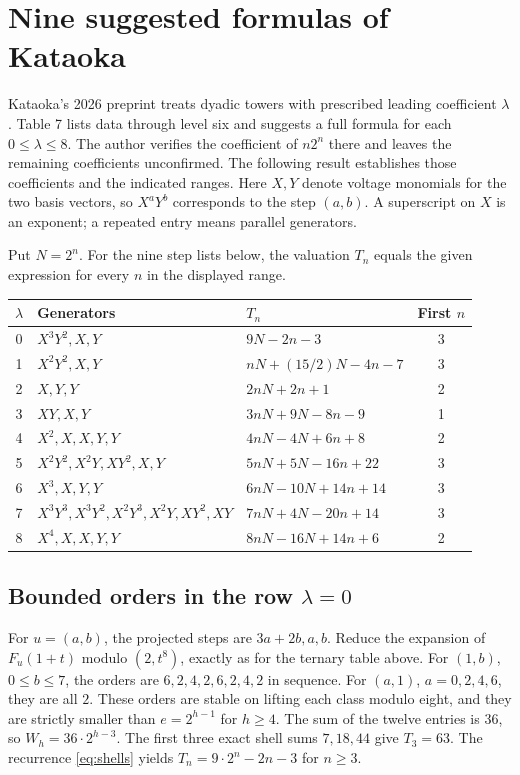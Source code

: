 \section{Nine suggested formulas of Kataoka}\label{sec:kataoka}
Kataoka's 2026 preprint \cite[\S6.3, Tables 6--7]{Kat} treats dyadic
towers with prescribed leading coefficient $\lambda$. Table 7 lists data
through level six and suggests a full formula for each $0\le\lambda\le8$.
The author verifies the coefficient of $n2^n$ there and leaves the
remaining coefficients unconfirmed. The following result establishes those
coefficients and the indicated ranges. Here $X,Y$ denote voltage
monomials for the two basis vectors, so $X^aY^b$ corresponds to the step
$(a,b)$. A superscript on $X$ is an exponent; a repeated entry means
parallel generators.

\begin{theorem}\label{thm:kataoka}
Put $N=2^n$. For the nine step lists below, the valuation $T_n$ equals the
given expression for every $n$ in the displayed range.
\begin{center}\small
\begin{tabular}{cllc}
\toprule
$\lambda$ & Generators & $T_n$ & First $n$\\
\midrule
0 & $X^3Y^2,X,Y$ & $9N-2n-3$ & 3\\
1 & $X^2Y^2,X,Y$ & $nN+(15/2)N-4n-7$ & 3\\
2 & $X,Y,Y$ & $2nN+2n+1$ & 2\\
3 & $XY,X,Y$ & $3nN+9N-8n-9$ & 1\\
4 & $X^2,X,X,Y,Y$ & $4nN-4N+6n+8$ & 2\\
5 & $X^2Y^2,X^2Y,XY^2,X,Y$ & $5nN+5N-16n+22$ & 3\\
6 & $X^3,X,Y,Y$ & $6nN-10N+14n+14$ & 3\\
7 & $X^3Y^3,X^3Y^2,X^2Y^3,X^2Y,XY^2,XY$ & $7nN+4N-20n+14$ & 3\\
8 & $X^4,X,X,Y,Y$ & $8nN-16N+14n+6$ & 2\\
\bottomrule
\end{tabular}
\end{center}
\end{theorem}

\subsection{Bounded orders in the row $\lambda=0$}
For $u=(a,b)$, the projected steps are $3a+2b,a,b$. Reduce the expansion
of $F_u(1+t)$ modulo $(2,t^8)$, exactly as for the ternary table above.
For $(1,b)$, $0\le b\le7$, the orders are
$6,2,4,2,6,2,4,2$ in sequence. For $(a,1)$, $a=0,2,4,6$, they are all $2$.
These orders are stable on lifting each class modulo eight, and they are
strictly smaller than $e=2^{h-1}$ for $h\ge4$.
The sum of the twelve entries is $36$, so $W_h=36\cdot2^{h-3}$.
The first three exact shell sums $7,18,44$ give $T_3=63$. The recurrence
\eqref{eq:shells} yields $T_n=9\cdot2^n-2n-3$ for $n\ge3$.





